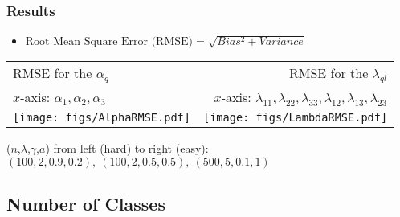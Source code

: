 \documentclass{beamer}
\begin{document}
\begin{frame}
  \frametitle{Results}
  \begin{itemize}
  \item $\text{Root Mean Square Error (RMSE)} = \sqrt{Bias^2 +
      Variance}$
  \end{itemize}
  \pause

\begin{overprint}
    \begin{center}
      \begin{tabular}{lr}
        RMSE for the $\alpha_q$ & RMSE for the
        $\lambda_{ql}$ \\
        $x$-axis: $\alpha_1, \alpha_2,\alpha_3$ & $x$-axis:
        $\lambda_{11}, \lambda_{22}, \lambda_{33}, \lambda_{12},
        \lambda_{13}, \lambda_{23}$\\
        \texttt{[image: figs/AlphaRMSE.pdf]} &
        \texttt{[image: figs/LambdaRMSE.pdf]} \\
      \end{tabular}

    ($n$,$\lambda$,$\gamma$,$a$) from left (hard) to right (easy):
    $(100,2,0.9,0.2),\ (100,2,0.5,0.5),\ (500,5,0.1,1)$
  \end{center}
\end{overprint}

\end{frame}

 \subsection{Number of Classes}
\end{document}
